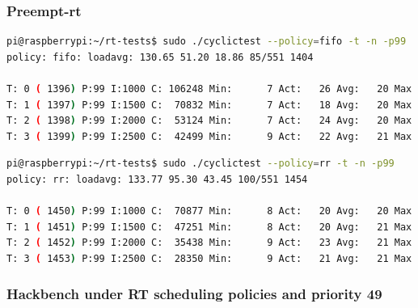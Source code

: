 \documentclass[10pt,a4paper]{article}
\begin{document}
\subsubsection{Preempt-rt}
\begin{lstlisting}[language=bash,caption={Preempt fifo with hackbench}]
pi@raspberrypi:~/rt-tests$ sudo ./cyclictest --policy=fifo -t -n -p99
policy: fifo: loadavg: 130.65 51.20 18.86 85/551 1404           

T: 0 ( 1396) P:99 I:1000 C: 106248 Min:      7 Act:   26 Avg:   20 Max:      78
T: 1 ( 1397) P:99 I:1500 C:  70832 Min:      7 Act:   18 Avg:   20 Max:      73
T: 2 ( 1398) P:99 I:2000 C:  53124 Min:      7 Act:   24 Avg:   20 Max:      73
T: 3 ( 1399) P:99 I:2500 C:  42499 Min:      9 Act:   22 Avg:   21 Max:      74
\end{lstlisting}
\begin{lstlisting}[language=bash,caption={Preempt rr with hackbench}]
pi@raspberrypi:~/rt-tests$ sudo ./cyclictest --policy=rr -t -n -p99 
policy: rr: loadavg: 133.77 95.30 43.45 100/551 1454          

T: 0 ( 1450) P:99 I:1000 C:  70877 Min:      8 Act:   20 Avg:   20 Max:      91
T: 1 ( 1451) P:99 I:1500 C:  47251 Min:      8 Act:   20 Avg:   21 Max:      83
T: 2 ( 1452) P:99 I:2000 C:  35438 Min:      9 Act:   23 Avg:   21 Max:      69
T: 3 ( 1453) P:99 I:2500 C:  28350 Min:      9 Act:   21 Avg:   21 Max:      92
\end{lstlisting}
\subsubsection{Hackbench under RT scheduling policies and priority 49}
\end{document}
